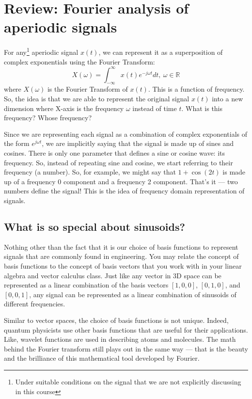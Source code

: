 \section{Review: Fourier analysis of aperiodic signals}
For any\footnote{Under suitable conditions on the signal that we are not explicitly discussing in this course} aperiodic signal $x(t)$, we can represent it as a superposition of complex exponentials using the Fourier Transform:
\[
X(\omega) = \int_{-\infty}^{\infty} x(t) e^{-j \omega t} dt, \: \omega \in \mathbb{R}
\]
where $X(\omega)$ is the Fourier Transform of $x(t)$. This is a function of frequency. So, the idea is that we are able to represent the original signal $x(t)$ into a new dimension where X-axis is the frequency $\omega$ instead of time $t$. What is this frequency? Whose frequency?

Since we are representing each signal as a combination of complex exponentials of the form $e^{j \omega t}$, we are implicitly saying that the signal is made up of sines and cosines. There is only one parameter that defines a sine or cosine wave: its frequency. So, instead of repeating sine and cosine, we start referring to their frequency (a number). So, for example, we might say that $1 + \cos(2t)$ is made up of a frequency 0 component and a frequency 2 component. That's it --- two numbers define the signal! This is the idea of frequency domain representation of signals.

\subsection{What is so special about sinusoids?}
Nothing other than the fact that it is our choice of basis functions to represent signals that are commonly found in engineering. You may relate the concept of basis functions to the concept of basis vectors that you work with in your linear algebra and vector calculus class. Just like any vector in 3D space can be represented as a linear combination of the basis vectors $[1, 0, 0]$, $[0, 1, 0]$, and $[0, 0, 1]$, any signal can be represented as a linear combination of sinusoids of different frequencies.

Similar to vector spaces, the choice of basis functions is not unique. Indeed, quantum physicists use other basis functions that are useful for their applications. Like, wavelet functions are used in describing atoms and molecules. The math behind the Fourier transform still plays out in the same way --- that is the beauty and the brilliance of this mathematical tool developed by Fourier.

